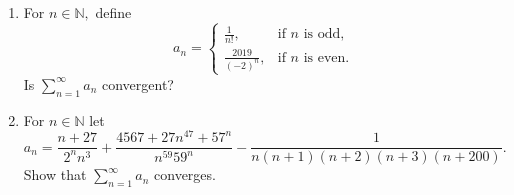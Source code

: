 \documentclass[openany, amssymb, psamsfonts]{amsart}
\newcommand{\bbN}{\mathbb{N}}
\newcommand{\abs}[1]{\lvert #1 \rvert}
\theoremstyle{definition}
\numberwithin{equation}{section}
\begin{document}
\begin{enumerate}
\begin{enumerate}
\begin{enumerate}
\begin{proof}
\end{proof}\vspace{4pt}     \hrule   \vspace{4pt}
\end{enumerate}
\end{enumerate}


\item For $n\in\bbN,$ define
$$a_n=\begin{cases} \frac{1}{n!}, & \text{if } n\text{ is odd},\\
\frac{2019}{(-2)^n}, & \text{if } n \text{ is even}.
\end{cases}$$
Is $\displaystyle \sum_{n=1}^\infty a_n$ convergent?

\item For $n\in\bbN$ let 
$$a_n=\frac{n+27}{2^n n^3}+ \frac{4567 + 27n^{47}+57^n}{n^{59}59^n}-\frac{1}{n(n+1)(n+2)(n+3)(n+200)}.$$
Show that $\displaystyle \sum_{n=1}^\infty a_n$  converges.





\end{enumerate}
\end{document}
